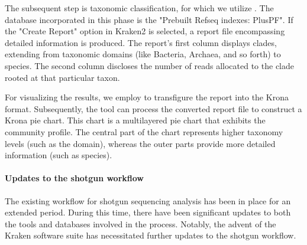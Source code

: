             The subsequent step is taxonomic classification, for which we utilize . The database incorporated in this phase is the "Prebuilt Refseq indexes: PlusPF". If the "Create Report" option in Kraken2 is selected, a report file encompassing detailed information is produced. The report's first column displays clades, extending from taxonomic domains (like Bacteria, Archaea, and so forth) to species. The second column discloses the number of reads allocated to the clade rooted at that particular taxon.
            
            For visualizing the results, we employ   \cite{blanco2023extending} to transfigure the report into the Krona format. Subsequently, the  tool can process the converted report file to construct a Krona pie chart. This chart is a multilayered pie chart that exhibits the community profile. The central part of the chart represents higher taxonomy levels (such as the domain), whereas the outer parts provide more detailed information (such as species).
            
        \paragraph*{Updates to the shotgun workflow}

            The existing workflow for shotgun sequencing analysis has been in place for an extended period. During this time, there have been significant updates to both the tools and databases involved in the process. Notably, the advent of the Kraken software suite \cite{lu2022metagenome} has necessitated further updates to the shotgun workflow.

